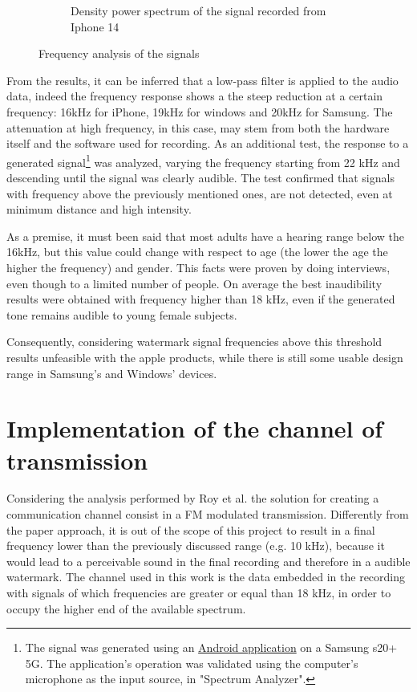\begin{figure}[h]
\begin{subfigure}{0.48\textwidth}
    \caption{Density power spectrum of the signal recorded from Iphone 14}
    \label{fig:FRiphone}
    \end{subfigure}%
    \caption{Frequency analysis of the signals}
    \label{fig:FR}
\end{figure}


From the results, it can be inferred that a low-pass filter is applied to the audio data, indeed the frequency response shows a the steep reduction at a certain frequency: 16kHz for iPhone, 19kHz for windows and 20kHz for Samsung. The attenuation at high frequency, in this case, may stem from both the hardware itself and the software used for recording. 
As an additional test, the response to a generated signal\footnote{The signal was generated using an \href{https://play.google.com/store/apps/details?id=com.keuwl.functiongenerator&hl=en}{Android application} on a Samsung s20+ 5G. The application's operation was validated using the computer's microphone as the input source, in "Spectrum Analyzer".} was analyzed, varying the frequency starting from 22 kHz and descending until the signal was clearly audible. The test confirmed that signals with frequency above the previously mentioned ones, are not detected, even at minimum distance and high intensity.

As a premise, it must been said that most adults have a hearing range below the 16kHz, but this value could change with respect to age (the lower the age the higher the frequency) and gender. This facts were proven by doing interviews, even though to a limited number of people. On average the best inaudibility results were obtained with frequency higher than 18 kHz, even if the generated tone remains audible to young female subjects. 

Consequently, considering watermark signal frequencies above this threshold results unfeasible with the apple products, while there is still some usable design range in Samsung's and Windows' devices.

\section{Implementation of the channel of transmission}
Considering the analysis performed by Roy et al.  \cite[page 5, BackDoor: Making Microphones Hear Inaudible Sounds]{backdoor} the solution for creating a communication channel consist in a FM modulated transmission. 
Differently from the paper approach, it is out of the scope of this project to result in a final frequency lower than the previously discussed range (e.g. 10 kHz), because it would lead to a perceivable sound in the final recording and therefore in a audible watermark. 
The channel used in this work is the data embedded in the recording with signals of which frequencies are greater or equal than 18 kHz, in order to occupy the higher end of the available spectrum.

